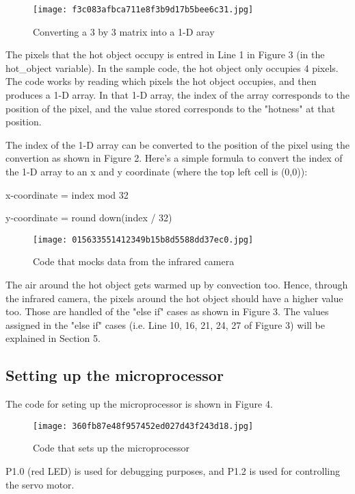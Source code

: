 \documentclass[12pt]{article}
\begin{document}
\linebreak

\begin{figure}[h]
\texttt{[image: f3c083afbca711e8f3b9d17b5bee6c31.jpg]}
\centering
\caption{Converting a 3 by 3 matrix into a 1-D aray}
\end{figure}

The pixels that the hot object occupy is entred in Line 1 in Figure 3 (in the hot\_object variable). In the sample code, the hot object only occupies 4 pixels. The code works by reading which pixels the hot object occupies, and then produces a 1-D array. In that 1-D array, the index of the array corresponds to the position of the pixel, and the value stored corresponds to the "hotness" at that position.

The index of the 1-D array can be converted to the position of the pixel using the convertion as shown in Figure 2. Here's a simple formula to convert the index of the 1-D array to an x and y coordinate (where the top left cell is (0,0)):

x-coordinate = index mod 32

y-coordinate = round down(index / 32)

\begin{figure}[h]
\texttt{[image: 015633551412349b15b8d5588dd37ec0.jpg]}
\centering
\caption{Code that mocks data from the infrared camera}
\end{figure}

The air around the hot object gets warmed up by convection too. Hence, through the infrared camera, the pixels around the hot object should have a higher value too. Those are handled of the "else if" cases as shown in Figure 3. The values assigned in the "else if" cases (i.e. Line 10, 16, 21, 24, 27 of Figure 3) will be explained in Section 5.

\subsection {Setting up the microprocessor}
The code for seting up the microprocessor is shown in Figure 4. 
\linebreak
\begin{figure}[h]
\texttt{[image: 360fb87e48f957452ed027d43f243d18.jpg]}
\centering
\caption{Code that sets up the microprocessor}
\end{figure}

P1.0 (red LED) is used for debugging purposes, and P1.2 is used for controlling the servo motor.
\end{document}

